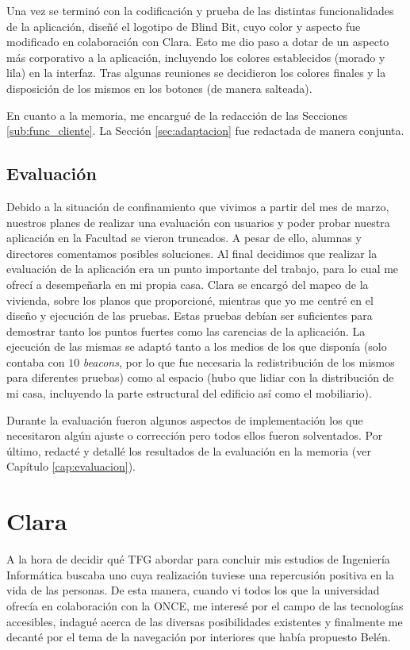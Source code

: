 Una vez se terminó con la codificación y prueba de las distintas funcionalidades de la aplicación, diseñé el logotipo de Blind Bit, cuyo color y aspecto fue modificado en colaboración con Clara. Esto me dio paso a dotar de un aspecto más corporativo a la aplicación, incluyendo los colores establecidos (morado y lila) en la interfaz. Tras algunas reuniones se decidieron los colores finales y la disposición de los mismos en los botones (de manera salteada).

En cuanto a la memoria, me encargué de la redacción de las Secciones \ref{sub:func_cliente}. La Sección \ref{sec:adaptacion} fue redactada de manera conjunta.

\subsection{Evaluación}

Debido a la situación de confinamiento que vivimos a partir del mes de marzo, nuestros planes de realizar una evaluación con usuarios y poder probar nuestra aplicación en la Facultad se vieron truncados. A pesar de ello, alumnas y directores comentamos posibles soluciones. Al final decidimos que realizar la evaluación de la aplicación era un punto importante del trabajo, para lo cual me ofrecí a desempeñarla en mi propia casa. Clara se encargó del mapeo de la vivienda, sobre los planos que proporcioné, mientras que yo me centré en el diseño y ejecución de las pruebas. Estas pruebas debían ser suficientes para demostrar tanto los puntos fuertes como las carencias de la aplicación. La ejecución de las mismas se adaptó tanto a los medios de los que disponía (solo contaba con $10$ \textit{beacons}, por lo que fue necesaria la redistribución de los mismos para diferentes pruebas) como al espacio (hubo que lidiar con la distribución de mi casa, incluyendo la parte estructural del edificio así como el mobiliario).

Durante la evaluación fueron algunos aspectos de implementación los que necesitaron algún ajuste o corrección pero todos ellos fueron solventados. Por último, redacté y detallé los resultados de la evaluación en la memoria (ver Capítulo \ref{cap:evaluacion}).


\section{Clara}
\label{sec:trabajoClara}

A la hora de decidir qué TFG abordar para concluir mis estudios de Ingeniería Informática buscaba uno cuya realización tuviese una repercusión positiva en la vida de las personas. De esta manera, cuando vi todos los que la universidad ofrecía en colaboración con la ONCE, me interesé por el campo de las tecnologías accesibles, indagué acerca de las diversas posibilidades existentes y finalmente me decanté por el tema de la navegación por interiores que había propuesto Belén.

